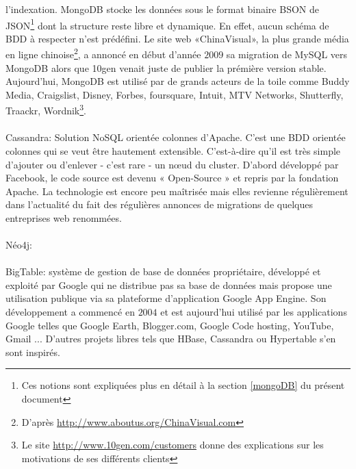 l'indexation. \textsf{MongoDB} stocke les données sous le format
binaire \textsf{BSON} de \textsf{JSON}\footnote{Ces notions sont
expliquées plus en détail à la section \ref{mongoDB} du présent
document} dont la structure reste libre et dynamique.  En effet, aucun
schéma de \textsf{BDD} à respecter n'est prédéfini\cite{mongoDB}. Le
site web «\textsf{ChinaVisual}», la plus grande média en ligne
chinoise\footnote{D'après \url{http://www.aboutus.org/ChinaVisual.com}},
a annoncé en début d'année $2009$ sa migration de \textsf{MySQL}
vers \textsf{MongoDB}\cite{GUYunhua} alors que \textsf{10gen} venait juste de publier la prémière version stable. Aujourd'hui, \textsf{MongoDB} est utilisé par de grands acteurs de la toile comme \textsf{Buddy Media, Craigslist, Disney, Forbes, foursquare, Intuit, MTV Networks, Shutterfly, Traackr, Wordnik}\footnote{Le site \url{http://www.10gen.com/customers} donne des explications sur les motivations de ses différents clients}.
\\
\\ 
\textsf{Cassandra}:  Solution \textsf{NoSQL} orientée \textsf{colonnes} d’\textsf{Apache}.  C’est une \textsf{BDD}
orientée colonnes qui se veut être hautement extensible. C’est-à-dire
qu’il est très simple d’ajouter ou d’enlever - c’est rare - un nœud du
cluster. D’abord développé par \textsf{Facebook}, le code source est
devenu « \textsf{Open-Source} » et repris par la
fondation \textsf{Apache}\cite{cassandra}.  La technologie est encore
peu maîtrisée mais elles revienne régulièrement dans l’actualité du
fait des régulières annonces de migrations de quelques
entreprises \textsf{web} renommées\cite{cassandra2}.
\\
\\
\textsf{Néo4j}: 
\\
\\
\textsf{BigTable}:  système de gestion de base de
données propriétaire, développé et exploité par Google qui ne
distribue pas sa base de données mais propose une utilisation publique
via sa plateforme d'application \textsf{Google App Engine}. Son
développement a commencé en $2004$ et est aujourd'hui utilisé par les
applications \textsf{Google} telles que \textsf{Google Earth},
\textsf{Blogger.com}, \textsf{Google Code hosting}, \textsf{YouTube},
\textsf{Gmail} ... D'autres projets libres tels que \textsf{HBase},
\textsf{Cassandra} ou \textsf{Hypertable} s'en sont
inspirés.
